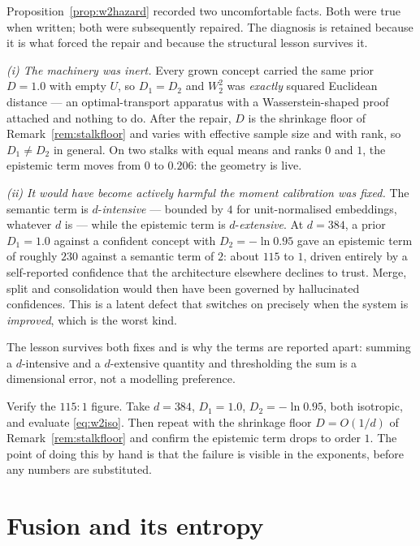 \begin{hon}\Hon
Proposition~\ref{prop:w2hazard} recorded two uncomfortable facts. Both
were true when written; both were subsequently repaired. The diagnosis
is retained because it is what forced the repair and because the
structural lesson survives it.

\emph{(i) The machinery was inert.} Every grown concept carried the same
prior $D=1.0$ with empty $U$, so $D_1=D_2$ and $W_2^2$ was
\emph{exactly} squared Euclidean distance --- an optimal-transport
apparatus with a Wasserstein-shaped proof attached and nothing to do.
After the repair, $D$ is the shrinkage floor of
Remark~\ref{rem:stalkfloor} and varies with effective sample size and
with rank, so $D_1\neq D_2$ in general. On two stalks with equal means
and ranks $0$ and $1$, the epistemic term moves from $0$ to $0.206$: the
geometry is live.

\emph{(ii) It would have become actively harmful the moment calibration
was fixed.} The semantic term is $d$-\emph{intensive} --- bounded by $4$
for unit-normalised embeddings, whatever $d$ is --- while the epistemic
term is $d$-\emph{extensive}. At $d=384$, a prior $D_1=1.0$ against a
confident concept with $D_2=-\ln0.95$ gave an epistemic term of roughly
$230$ against a semantic term of $2$: about $115$ to $1$, driven
entirely by a self-reported confidence that the architecture elsewhere
declines to trust. Merge, split and consolidation would then have been
governed by hallucinated confidences. This is a latent defect that
switches on precisely when the system is \emph{improved}, which is the
worst kind.

The lesson survives both fixes and is why the terms are reported apart:
summing a $d$-intensive and a $d$-extensive quantity and thresholding
the sum is a dimensional error, not a modelling preference.
\end{hon}

\begin{exercise}
Verify the $115{:}1$ figure. Take $d=384$, $D_1=1.0$, $D_2=-\ln 0.95$,
both isotropic, and evaluate \eqref{eq:w2iso}. Then repeat with the
shrinkage floor $D=O(1/d)$ of Remark~\ref{rem:stalkfloor} and confirm
the epistemic term drops to order $1$. The point of doing this by hand
is that the failure is visible in the exponents, before any numbers are
substituted.
\end{exercise}

\section{Fusion and its entropy}

